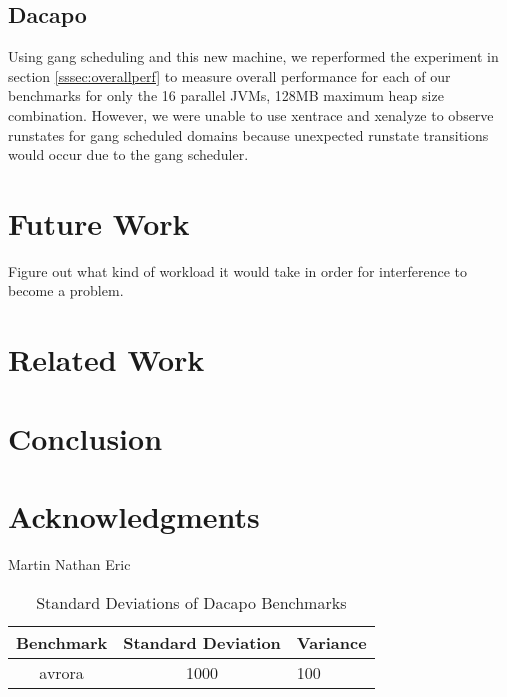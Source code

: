 \documentclass{sig-alternate}
\begin{document}
\subsection{Dacapo}
Using gang scheduling and this new machine, we reperformed the experiment in section \ref{sssec:overallperf} to measure overall performance for each of our benchmarks for only the 16 parallel JVMs, 128MB maximum heap size combination. However, we were unable to use xentrace and xenalyze to observe runstates for gang scheduled domains because unexpected runstate transitions would occur due to the gang scheduler.

\section{Future Work}

Figure out what kind of workload it would take in order for interference to become a problem.

\section{Related Work}


\section{Conclusion}


\section{Acknowledgments}
Martin
Nathan
Eric

\begin{table}
\centering
\caption{Standard Deviations of Dacapo Benchmarks}
\begin{tabular}{|c|c|l|} \hline
Benchmark&Standard Deviation&Variance\\ \hline
avrora &1000&100\\
\hline\end{tabular}
\end{table}


%
%

\balancecolumns
\end{document}
